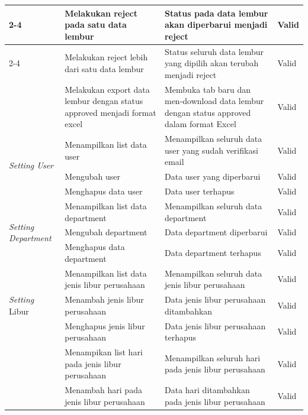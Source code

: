 \begin{longtable}{ |p{3cm}|p{4cm}|p{4cm}|p{2cm}|}
\cline{2-4}
&Melakukan reject pada satu data lembur
&Status pada data lembur akan diperbarui menjadi reject
&Valid
\\

\cline{2-4}
&Melakukan reject lebih dari satu data lembur
&Status seluruh data lembur yang dipilih akan terubah menjadi reject
&Valid
\\
\hline

\multirow{1}{*}{}
&Melakukan export data lembur dengan status approved menjadi format excel
&Membuka tab baru dan men-download data lembur dengan status approved dalam format Excel
&Valid
\\
\hline

\multirow{3}{*}{\textit{Setting User}}
&Menampilkan list data user
&Menampilkan seluruh data user yang sudah verifikasi email
&Valid
\\

\cline{2-4}
&Mengubah user
&Data user yang diperbarui
&Valid
\\

\cline{2-4}
&Menghapus data user
&Data user terhapus
&Valid
\\
\hline

\multirow{3}{*}{\textit{Setting Department}}
&Menampilkan list data department
&Menampilkan seluruh data department
&Valid
\\

\cline{2-4}
&Mengubah department
&Data department diperbarui
&Valid
\\

\cline{2-4}
&Menghapus data department
&Data department terhapus
&Valid
\\
\hline

\multirow{3}{*}{\textit{Setting} Libur}
&Menampilkan list data jenis libur perusahaan
&Menampilkan seluruh data jenis libur perusahaan
&Valid
\\

\cline{2-4}
&Menambah jenis libur perusahaan
&Data jenis libur perusahaan ditambahkan
&Valid
\\

\cline{2-4}
&Menghapus jenis libur perusahaan
&Data jenis libur perusahaan terhapus
&Valid
\\
\hline

\multirow{4}{*}{}
&Menampikan list hari pada jenis libur perusahaan
&Menampilkan seluruh hari pada jenis libur perusahaan
&Valid
\\

\cline{2-4}
&Menambah hari pada jenis libur perusahaan
&Data hari ditambahkan pada jenis libur perusahaan
&Valid
\\


\end{longtable}

